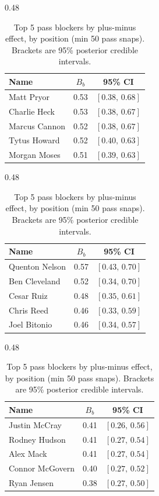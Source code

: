 \begin{table}[h!]
\centering
\begin{subtable}{0.48\textwidth}
\centering
\footnotesize
\begin{tabular}{lcc}
\toprule
Name & $B_b$ & 95\% CI \\
\midrule
Matt Pryor & 0.53 & $[0.38,\,0.68]$ \\
Charlie Heck & 0.53 & $[0.38,\,0.67]$ \\
Marcus Cannon & 0.52 & $[0.38,\,0.67]$ \\
Tytus Howard & 0.52 & $[0.40,\,0.63]$ \\
Morgan Moses & 0.51 & $[0.39,\,0.63]$ \\
\bottomrule
\end{tabular}
\caption{T}
\end{subtable}
\hfill
\begin{subtable}{0.48\textwidth}
\centering
\footnotesize
\begin{tabular}{lcc}
\toprule
Name & $B_b$ & 95\% CI \\
\midrule
Quenton Nelson & 0.57 & $[0.43,\,0.70]$ \\
Ben Cleveland & 0.52 & $[0.34,\,0.70]$ \\
Cesar Ruiz & 0.48 & $[0.35,\,0.61]$ \\
Chris Reed & 0.46 & $[0.33,\,0.59]$ \\
Joel Bitonio & 0.46 & $[0.34,\,0.57]$ \\
\bottomrule
\end{tabular}
\caption{G}
\end{subtable}

\bigskip
\begin{subtable}{0.48\textwidth}
\centering
\footnotesize
\begin{tabular}{lcc}
\toprule
Name & $B_b$ & 95\% CI \\
\midrule
Justin McCray & 0.41 & $[0.26,\,0.56]$ \\
Rodney Hudson & 0.41 & $[0.27,\,0.54]$ \\
Alex Mack & 0.41 & $[0.27,\,0.54]$ \\
Connor McGovern & 0.40 & $[0.27,\,0.52]$ \\
Ryan Jensen & 0.38 & $[0.27,\,0.50]$ \\
\bottomrule
\end{tabular}
\caption{C}
\end{subtable}
\caption{Top 5 pass blockers by plus-minus effect, by position (min 50 pass snaps). Brackets are 95\% posterior credible intervals.}
\label{tab:blocker_pm_top}
\end{table}
